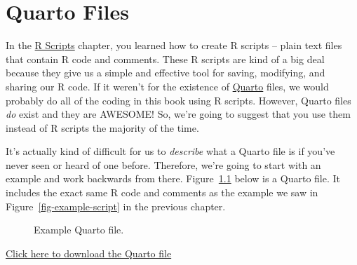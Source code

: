 \documentclass[
  letterpaper,
  DIV=11,
  numbers=noendperiod]{scrreprt}
\begin{document}
\chapter{Quarto Files}\label{quarto-files}

In the \href{../r_scripts/r_scripts.qmd}{R Scripts} chapter, you learned
how to create R scripts -- plain text files that contain R code and
comments. These R scripts are kind of a big deal because they give us a
simple and effective tool for saving, modifying, and sharing our R code.
If it weren't for the existence of \href{https://quarto.org/}{Quarto}
files, we would probably do all of the coding in this book using R
scripts. However, Quarto files \emph{do} exist and they are AWESOME! So,
we're going to suggest that you use them instead of R scripts the
majority of the time.

It's actually kind of difficult for us to \emph{describe} what a Quarto
file is if you've never seen or heard of one before. Therefore, we're
going to start with an example and work backwards from there.
Figure~\ref{fig-example-quarto} below is a Quarto file. It includes the
exact same R code and comments as the example we saw in
Figure~\ref{fig-example-script} in the previous chapter.

\begin{figure}


\caption{\label{fig-example-quarto}Example Quarto file.}

\end{figure}%

\href{https://www.dropbox.com/scl/fi/f94bvm9tc8uysdn7wdmd1/example_quarto.qmd?rlkey=xph6sib0hwct98rfbumt68600&dl=1}{Click
here to download the Quarto file}
\end{document}
